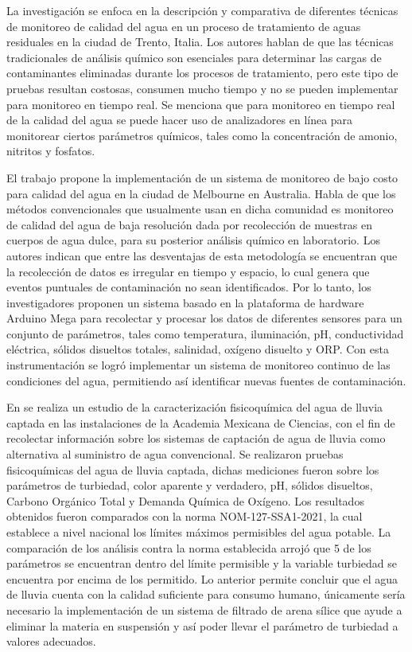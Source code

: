 La investigación \cite{foladori_evolution_2018} se enfoca en la descripción y comparativa de diferentes técnicas de monitoreo de calidad del agua en un proceso de tratamiento de aguas residuales en la ciudad de Trento, Italia. 
Los autores hablan de que las técnicas tradicionales de análisis químico son esenciales para determinar las cargas de contaminantes eliminadas durante los procesos de tratamiento, pero este tipo de pruebas resultan 
costosas, consumen mucho tiempo y no se pueden implementar para monitoreo en tiempo real. Se menciona que para monitoreo en tiempo real de la 
calidad del agua se puede hacer uso de analizadores en línea para monitorear ciertos parámetros químicos, tales como la concentración de amonio, nitritos y fosfatos. 

El trabajo \cite{low_cost_Rao} propone la implementación de un sistema de monitoreo de bajo costo para calidad del agua en la ciudad de Melbourne en Australia. Habla de que los métodos convencionales que usualmente usan 
en dicha comunidad es monitoreo de calidad del agua de baja resolución dada por recolección de muestras en cuerpos de agua dulce, para su posterior análisis químico en laboratorio. Los autores indican que entre las desventajas 
de esta metodología se encuentran que la recolección de datos es irregular en tiempo y espacio, lo cual genera que eventos puntuales de contaminación no sean identificados. Por lo tanto, los investigadores proponen un sistema basado en la plataforma de hardware Arduino Mega para recolectar y procesar los datos de diferentes sensores
para un conjunto de parámetros, tales como temperatura, iluminación, pH, conductividad eléctrica, sólidos disueltos totales, salinidad, oxígeno disuelto y ORP. Con esta instrumentación se logró implementar un sistema 
de monitoreo continuo de las condiciones del agua, permitiendo así identificar nuevas fuentes de contaminación.

En \cite{Cambioclimatico} se realiza un estudio de la caracterización fisicoquímica del agua de lluvia captada en las instalaciones de la Academia Mexicana de Ciencias, con 
el fin de recolectar información sobre los sistemas de captación de agua de lluvia como alternativa al suministro de agua convencional. Se realizaron pruebas 
fisicoquímicas del agua de lluvia captada, dichas mediciones fueron sobre los parámetros de turbiedad, color aparente y verdadero, pH, sólidos disueltos, Carbono Orgánico 
Total y Demanda Química de Oxígeno. Los resultados obtenidos fueron comparados con la norma NOM-127-SSA1-2021, la cual establece a nivel nacional los límites máximos permisibles 
del agua potable. La comparación de los análisis contra la norma establecida arrojó que 5 de los parámetros se encuentran dentro del límite permisible y la variable turbiedad se 
encuentra por encima de los permitido. Lo anterior permite concluir que el agua de lluvia cuenta con la calidad suficiente para consumo humano, únicamente sería necesario la 
implementación de un sistema de filtrado de arena sílice que ayude a eliminar la materia en suspensión y así poder llevar el parámetro de turbiedad a valores adecuados.

